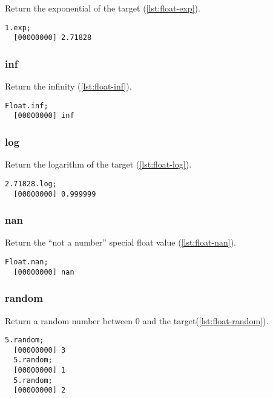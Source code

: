 Return the exponential of the target (\autoref{lst:float-exp}).

\begin{lstlisting}[caption=Float.exp, label=lst:float-exp,
  float=\floatposh]
  1.exp;
  [00000000] 2.71828
\end{lstlisting}

\subsubsection{inf}

Return the infinity (\autoref{lst:float-inf}).

\begin{lstlisting}[caption=Float.inf, label=lst:float-inf,
  float=\floatposh]
  Float.inf;
  [00000000] inf
\end{lstlisting}

\subsubsection{log}

Return the logarithm of the target (\autoref{lst:float-log}).

\begin{lstlisting}[caption=Float.log, label=lst:float-log,
  float=\floatposh]
  2.71828.log;
  [00000000] 0.999999
\end{lstlisting}

\subsubsection{nan}

Return the ``not a number'' special float value (\autoref{lst:float-nan}).

\begin{lstlisting}[caption=Float.nan, label=lst:float-nan,
  float=\floatposh]
  Float.nan;
  [00000000] nan
\end{lstlisting}

\subsubsection{random}

Return a random number between 0 and the target(\autoref{lst:float-random}).

\begin{lstlisting}[caption=Float.random, label=lst:float-random,
  float=\floatposh]
  5.random;
  [00000000] 3
  5.random;
  [00000000] 1
  5.random;
  [00000000] 2
\end{lstlisting}

